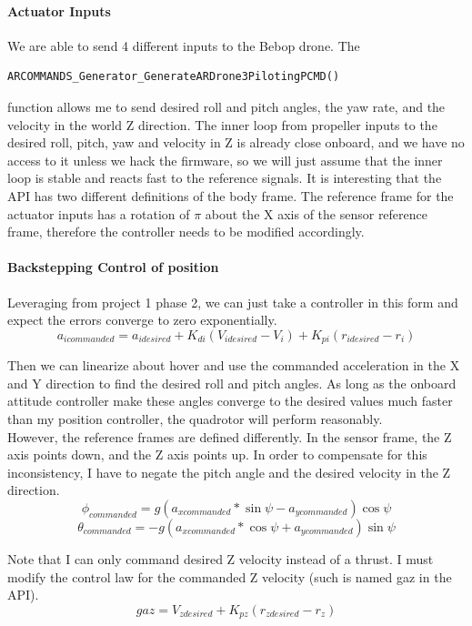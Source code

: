 \documentclass[english, twocolumn]{article}
\begin{document}
\paragraph{Actuator Inputs}
We are able to send 4 different inputs to the Bebop drone. The
\begin{verbatim}
ARCOMMANDS_Generator_GenerateARDrone3PilotingPCMD()
\end{verbatim} function 
allows me to send desired roll and pitch angles, the yaw rate, and the velocity
in the world Z direction. The inner loop from propeller inputs to the desired
roll, pitch, yaw and velocity in Z is already close onboard, and we have no 
access to it unless we hack the firmware, so we will just assume that the inner
loop is stable and reacts fast to the reference signals. It is interesting that the
API has two different definitions of the body frame. The reference frame for
the actuator inputs has a rotation of $\pi$ about the X axis of the sensor
reference frame, therefore the controller needs to be modified accordingly.\\

\paragraph{Backstepping Control of position}
Leveraging from project 1 phase 2, we can just take a controller in this form and expect the errors converge to zero exponentially.
$$a_{i commanded} = a_{i desired} + K_{di}(V_{i desired} - V_i) + K_{p i}(r_{i desired} - r_i)$$

Then we can linearize about hover and use the commanded acceleration in the X and Y direction to find the desired roll and pitch angles. As long as the onboard attitude controller make these angles converge to the desired values much faster than my position controller, the quadrotor will perform reasonably.\\

However, the reference frames are defined differently. In the sensor frame, the Z axis points down, and the Z axis points up. In order to compensate for this inconsistency, I have to negate the pitch angle and the desired velocity in the Z direction.
$$
\phi_{commanded} = g(a_{x commanded}*\sin\psi - a_{y commanded})\cos\psi
$$
$$\theta_{commanded} = -g(a_{x commanded}*\cos\psi + a_{y commanded})\sin\psi$$


Note that I can only command desired Z velocity instead of a thrust. I must modify the control law for the commanded Z velocity (such is named gaz in the API).
\begin{equation}
gaz = V_{z desired} + K_{pz}(r_{z desired} - r_z)
\end{equation}
\end{document}
